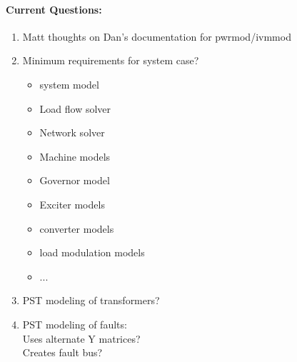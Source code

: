 \documentclass[12pt]{article}
\begin{document}
\begin{multicols}{2}
\paragraph{Current Questions:}
	\begin{enumerate}
	\itemsep0em 
\item Matt thoughts on Dan's documentation for pwrmod/ivmmod
		\item Minimum requirements for system case?
\begin{minipage}{\linewidth}
\begin{multicols}{2}
		\begin{itemize}
\itemsep0em 
		\footnotesize
			\item system model
			\item Load flow solver
			\item Network solver
			\item Machine models
			\item Governor model
			\item Exciter models
			\item converter models
			\item load modulation models
			\item ...
		\end{itemize}
\end{multicols}
\end{minipage}

		\item PST modeling of transformers?
		\item PST modeling of faults: \\
		Uses alternate Y matrices? \\
		Creates fault bus?
	\end{enumerate}



\vfill\null
\end{multicols}
\end{document}
